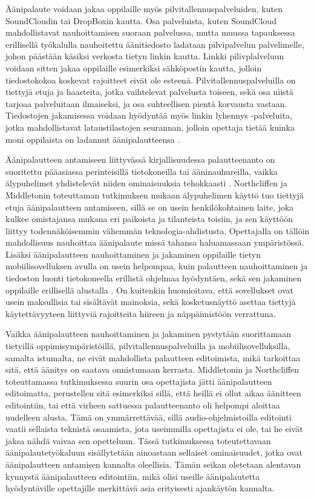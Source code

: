 \documentclass[utf8]{gradu3}
\begin{document}
Äänipalaute voidaan jakaa oppilaille myös pilvitallennuspalveluiden, kuten SoundCloudin tai DropBoxin kautta. Osa palveluista, kuten SoundCloud mahdollistavat nauhoittamisen suoraan palvelussa, mutta muussa tapauksessa erillisellä työkalulla nauhoitettu äänitiedosto ladataan pilvipalvelun palvelimelle, johon päästään käsiksi verkosta tietyn linkin kautta. Linkki pilivplalveluun voidaan sitten jakaa oppilaille esimerkiksi sähköpostin kautta, jolloin tiedostokokoa koskevat rajoitteet eivät ole esteenä. Pilvitallennuspalveluilla on tiettyjä etuja ja haasteita, jotka vaihtelevat palvelusta toiseen, sekä osa niistä tarjoaa palveluitaan ilmaiseksi, ja osa suhteellisen pientä korvausta vastaan. Tiedostojen jakamisessa voidaan hyödyntää myös linkin lyhennys -palveluita, jotka mahdollistavat lataustilastojen seurannan, jolloin opettaja tietää kuinka moni oppilaista on ladannut äänipalautteensa \parencite[][]{engaging}.

Äänipalautteen antamiseen liittyvässä kirjallisuudessa palautteenanto on suoritettu pääasiassa perinteisillä tietokoneilla tai ääninauhureilla, vaikka älypuhelimet yhdistelevät niiden ominaisuuksia tehokkaasti \parencite{smartphone}. Northcliffen ja Middletonin \parencite*{smartphone} toteuttaman tutkimuksen mukaan älypuhelimen käyttö tuo tiettyjä etuja äänipalautteen antamiseen, sillä se on usein henkilökohtainen laite, joka kulkee omistajansa mukana eri paikoista ja tilanteista toisiin, ja sen käyttöön liittyy todennäköisemmin vähemmän teknologia-ahdistusta. Opettajalla on tällöin mahdollisuus nauhoittaa äänipalaute missä tahansa haluamassaan ympäristössä. Lisäksi äänipalautteen nauhoittaminen ja jakaminen oppilaille tietyn mobiilisovelluksen avulla on usein helpompaa, kuin palautteen nauhoittaminen ja tiedoston luonti tietokoneella erillistä ohjelmaa hyödyntäen, sekä sen jakaminen oppilaille erillisellä alustalla \parencite{smartphone}. On kuitenkin huomioitava, että sovellukset ovat usein maksullisia tai sisältävät mainoksia, sekä kosketusnäyttö asettaa tiettyjä käytettävyyteen liittyviä rajoitteita hiireen ja näppäimistöön verrattuna.

Vaikka äänipalautteen nauhoittaminen ja jakaminen pystytään suorittamaan tietyillä oppimisympäristöillä, pilvitallennuspalveluilla ja mobiilisovelluksilla, samalta istumalta, ne eivät mahdollista palautteen editoimista, mikä tarkoittaa sitä, että äänitys on saatava onnistumaan kerrasta. Middletonin ja Northcliffen \parencite*{principles} toteuttamassa tutkimuksessa suurin osa opettajista jätti äänipalautteen editoimatta, perustellen sitä esimerkiksi sillä, että heillä ei ollut aikaa äänitteen editointiin, tai että virheen sattuessa palautteenanto oli helpompi aloittaa uudelleen alusta. Tämä on ymmärrettävää, sillä audio-ohjelmistoilla editointi  vaatii sellaista teknistä osaamista, jota useimmilla opettajista ei ole, tai he eivät jaksa nähdä vaivaa sen opetteluun. Tässä tutkimuksessa toteutettavaan äänipalautetyökaluun sisällytetään ainoastaan sellaiset ominaisuudet, jotka ovat äänipalautteen antamisen kannalta oleellisia. Tämän seikan oletetaan alentavan kynnystä äänipalautteen editointiin, mikä olisi useille äänipalautetta hyödyntäville opettajille merkittävä asia erityisesti ajankäytön kannalta.
\end{document}
